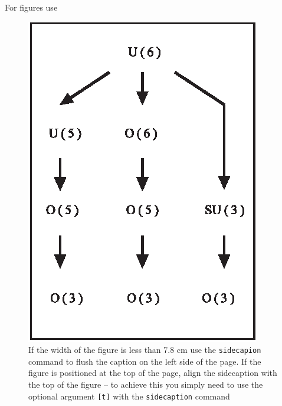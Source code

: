 For figures use
\begin{figure}[b]
\sidecaption
\includegraphics[scale=.65]{figure}
%
%
\caption{If the width of the figure is less than 7.8 cm use the \texttt{sidecapion} command to flush the caption on the left side of the page. If the figure is positioned at the top of the page, align the sidecaption with the top of the figure -- to achieve this you simply need to use the optional argument \texttt{[t]} with the \texttt{sidecaption} command}
\label{fig:1}       %
\end{figure}



